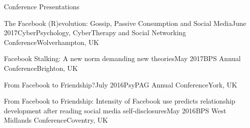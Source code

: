 \documentclass{resume} %
\begin{document}
\begin{rSection}{Conference Presentations}
\begin{rSubsection}{The Facebook (R)evolution: Gossip, Passive Consumption and Social Media}{June 2017}{CyberPsychology, CyberTherapy and Social Networking Conference}{Wolverhampton, UK}
\item[]\vspace{-1.5\baselineskip}
\end{rSubsection}


\begin{rSubsection}{Facebook Stalking: A new norm demanding new theories}{May 2017}{BPS Annual Conference}{Brighton, UK}
\item[]\vspace{-1.5\baselineskip}
\end{rSubsection}


\begin{rSubsection}{From Facebook to Friendship?}{July 2016}{PsyPAG Annual Conference}{York, UK}
\item[]\vspace{-1.5\baselineskip}
\end{rSubsection}


\begin{rSubsection}{From Facebook to Friendship: Intensity of Facebook use predicts relationship development after reading social media self-disclosures}{May 2016}{BPS West Midlands Conference}{Coventry, UK}
\item[]\vspace{-1.5\baselineskip}
\end{rSubsection}

\end{rSection}
\end{document}
